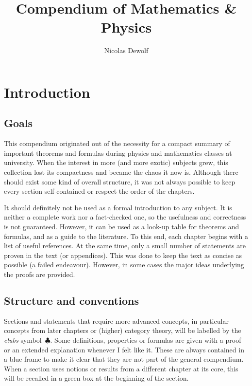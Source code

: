 \documentclass[12pt, a4paper]{report}
\begin{document}
\hypersetup{allcolors = black}

\title{Compendium of Mathematics \& Physics}
\author{Nicolas Dewolf}
\maketitle

\dominitoc
\doparttoc
\tableofcontents

\hypersetup{allcolors = UGent}

\chapter*{Introduction}
\mtcaddchapter
\section*{Goals}

   This compendium originated out of the necessity for a compact summary of important theorems and formulas during physics and mathematics classes at university. When the interest in more (and more exotic) subjects grew, this collection lost its compactness and became the chaos it now is. Although there should exist some kind of overall structure, it was not always possible to keep every section self-contained or respect the order of the chapters.

   It should definitely not be used as a formal introduction to any subject. It is neither a complete work nor a fact-checked one, so the usefulness and correctness is not guaranteed. However, it can be used as a look-up table for theorems and formulas, and as a guide to the literature. To this end, each chapter begins with a list of useful references. At the same time, only a small number of statements are proven in the text (or appendices). This was done to keep the text as concise as possible (a failed endeavour). However, in some cases the major ideas underlying the proofs are provided.

\section*{Structure and conventions}

   Sections and statements that require more advanced concepts, in particular concepts from later chapters or (higher) category theory, will be labelled by the \textit{clubs} symbol~$\clubsuit$. Some definitions, properties or formulas are given with a proof or an extended explanation whenever I felt like it. These are always contained in a blue frame to make it clear that they are not part of the general compendium. When a section uses notions or results from a different chapter at its core, this will be recalled in a green box at the beginning of the section.
\end{document}
